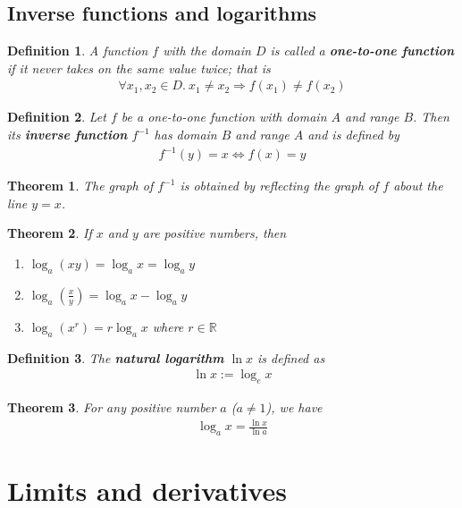\documentclass{article}
\theoremstyle{sltheorem}
\newtheorem{definition}{Definition}[section]
\newtheorem{theorem}{Theorem}[section]
\newcommand{\R}{\mathbb{R}}
\begin{document}
\subsection{Inverse functions and logarithms}
\begin{definition}
    A function $f$ with the domain $D$ is called a \textbf{one-to-one function} if it never takes on the same value twice; that is
    \begin{align*}
        \forall x_1, x_2 \in D.\: x_1\not=x_2 \Rightarrow f(x_1)\not= f(x_2)
    \end{align*}
\end{definition}
\begin{definition}
    Let $f$ be a one-to-one function with domain $A$ and range $B$. Then its \textbf{inverse function} $f^{-1}$ has domain $B$ and range $A$ and is defined by
    \begin{align*}
        f^{-1}(y) = x \Leftrightarrow f(x) = y
    \end{align*}
\end{definition}
\begin{theorem}
    The graph of $f^{-1}$ is obtained by reflecting the graph of $f$ about the line $y=x$.
\end{theorem}
\begin{theorem}
    If $x$ and $y$ are positive numbers, then
    \begin{enumerate}
        \item $\log_a(xy)=\log_ax=\log_ay$
        \item $\log_a(\frac{x}{y}) = \log_ax - \log_ay$
        \item $\log_a(x^r)=r\log_ax$ where $r\in\R$
    \end{enumerate}
\end{theorem}
\begin{definition}
    The \textbf{natural logarithm} $\ln x$ is defined as
    \begin{align*}
        \ln x := \log_e x
    \end{align*}
\end{definition}
\begin{theorem}
    For any positive number $a$ ($a\not=1$), we have
    \begin{align*}
        \log_a x = \frac{\ln x}{\ln a}
    \end{align*}
\end{theorem}
\section{Limits and derivatives}
\setcounter{subsection}{1}
\end{document}
